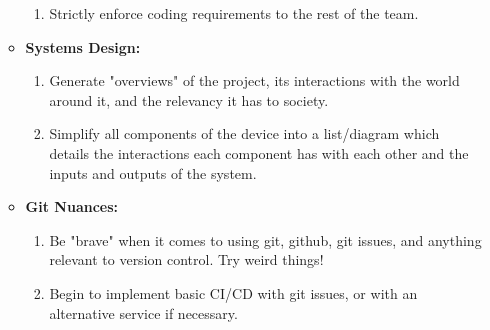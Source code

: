 \documentclass[12pt]{article}
\begin{document}
\begin{enumerate}
\begin{itemize}
\begin{enumerate}
		\item Strictly enforce coding requirements to the rest of the team.
		\end{enumerate}
	\item \textbf{Systems Design:}
		\begin{enumerate}
		\item Generate "overviews" of the project, its interactions with the world around it, and the relevancy it has to society.
		\item Simplify all components of the device into a list/diagram which details the interactions each component has with each other and the inputs and outputs of the system.
		\end{enumerate}
	\item \textbf{Git Nuances:}
		\begin{enumerate}
		\item Be "brave" when it comes to using git, github, git issues, and anything relevant to version control. Try weird things!
		\item Begin to implement basic CI/CD with git issues, or with an alternative service if necessary.
		\end{enumerate}
	\end{itemize}
\end{enumerate}
\end{document}
